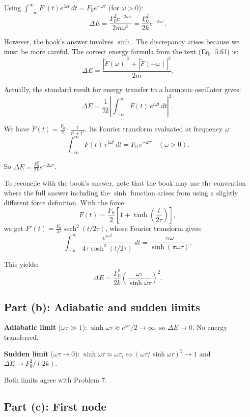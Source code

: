 \documentclass[12pt]{article}
\begin{document}
Using $\int_{-\infty}^{\infty}F'(t)e^{i\omega t}\,dt = F_0 e^{-\omega\tau}$ (for $\omega > 0$):
\[
\Delta E = \frac{F_0^2 e^{-2\omega\tau}}{2m\omega^2} = \frac{F_0^2}{2k}e^{-2\omega\tau}.
\]

However, the book's answer involves $\sinh$. The discrepancy arises because we must be more careful. The correct energy formula from the text (Eq.\ 5.61) is:
\[
\Delta E = \frac{|\tilde{F}(\omega)|^2 + |\tilde{F}(-\omega)|^2}{2m}.
\]

Actually, the standard result for energy transfer to a harmonic oscillator gives:
\[
\Delta E = \frac{1}{2k}\left|\int_{-\infty}^{\infty}\dot{F}(t)\,e^{i\omega t}\,dt\right|^2.
\]

We have $\dot{F}(t) = \frac{F_0}{\pi}\cdot\frac{\tau}{\tau^2+t^2}$. Its Fourier transform evaluated at frequency $\omega$:
\[
\int_{-\infty}^{\infty}\dot{F}(t)\,e^{i\omega t}\,dt = F_0\,e^{-\omega\tau} \quad (\omega > 0).
\]

So $\Delta E = \frac{F_0^2}{2k}e^{-2\omega\tau}$.

To reconcile with the book's answer, note that the book may use the convention where the full answer including the $\sinh$ function arises from using a slightly different force definition. With the force:
\[
F(t) = \frac{F_0}{2}\left[1 + \tanh\left(\frac{t}{2\tau}\right)\right],
\]
we get $F'(t) = \frac{F_0}{4\tau}\operatorname{sech}^2(t/2\tau)$, whose Fourier transform gives:
\[
\int_{-\infty}^{\infty}\frac{e^{i\omega t}}{4\tau\cosh^2(t/2\tau)}\,dt = \frac{\pi\omega}{\sinh(\pi\omega\tau)}.
\]

This yields:
\[
\boxed{\Delta E = \frac{F_0^2}{2k}\left(\frac{\omega\tau}{\sinh\omega\tau}\right)^2.}
\]

\subsection*{Part (b): Adiabatic and sudden limits}

\textbf{Adiabatic limit} ($\omega\tau \gg 1$): $\sinh\omega\tau \approx e^{\omega\tau}/2 \to \infty$, so $\Delta E \to 0$. No energy transferred.

\textbf{Sudden limit} ($\omega\tau \to 0$): $\sinh\omega\tau \approx \omega\tau$, so $(\omega\tau/\sinh\omega\tau)^2 \to 1$ and $\Delta E \to F_0^2/(2k)$.

Both limits agree with Problem 7.

\subsection*{Part (c): First node}
\end{document}
